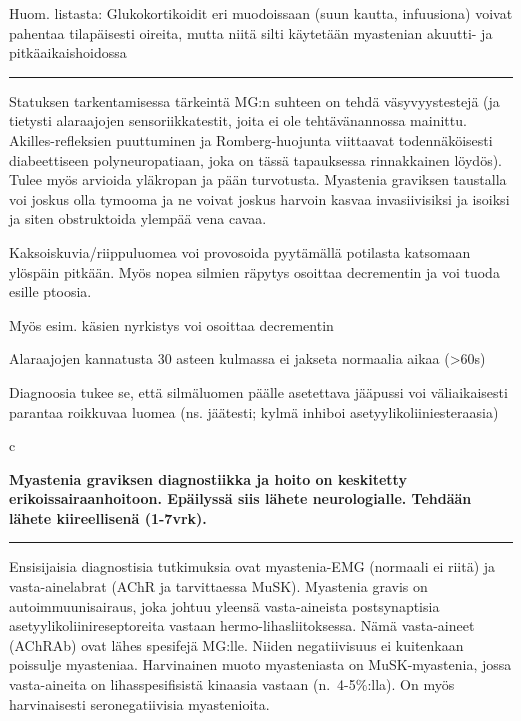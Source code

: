 \documentclass[
]{book}
\begin{document}
Huom. listasta: Glukokortikoidit eri muodoissaan (suun kautta, infuusiona) voivat pahentaa tilapäisesti oireita, mutta niitä silti käytetään myastenian akuutti- ja pitkäaikaishoidossa

\begin{center}\rule{0.5\linewidth}{0.5pt}\end{center}

Statuksen tarkentamisessa tärkeintä MG:n suhteen on tehdä väsyvyystestejä (ja tietysti alaraajojen sensoriikkatestit, joita ei ole tehtävänannossa mainittu. Akilles-refleksien puuttuminen ja Romberg-huojunta viittaavat todennäköisesti diabeettiseen polyneuropatiaan, joka on tässä tapauksessa rinnakkainen löydös). Tulee myös arvioida yläkropan ja pään turvotusta. Myastenia graviksen taustalla voi joskus olla tymooma ja ne voivat joskus harvoin kasvaa invasiivisiksi ja isoiksi ja siten obstruktoida ylempää vena cavaa.

Kaksoiskuvia/riippuluomea voi provosoida pyytämällä potilasta katsomaan ylöspäin pitkään. Myös nopea silmien räpytys osoittaa decrementin ja voi tuoda esille ptoosia.

Myös esim. käsien nyrkistys voi osoittaa decrementin

Alaraajojen kannatusta 30 asteen kulmassa ei jakseta normaalia aikaa (\textgreater60s)

Diagnoosia tukee se, että silmäluomen päälle asetettava jääpussi voi väliaikaisesti parantaa roikkuvaa luomea (ns. jäätesti; kylmä inhiboi asetyylikoliiniesteraasia)

c

\textbf{Myastenia graviksen diagnostiikka ja hoito on keskitetty erikoissairaanhoitoon. Epäilyssä siis lähete neurologialle. Tehdään lähete kiireellisenä (1-7vrk).}

\begin{center}\rule{0.5\linewidth}{0.5pt}\end{center}

Ensisijaisia diagnostisia tutkimuksia ovat myastenia-EMG (normaali ei riitä) ja vasta-ainelabrat (AChR ja tarvittaessa MuSK). Myastenia gravis on autoimmuunisairaus, joka johtuu yleensä vasta-aineista postsynaptisia asetyylikoliinireseptoreita vastaan hermo-lihasliitoksessa. Nämä vasta-aineet (AChRAb) ovat lähes spesifejä MG:lle. Niiden negatiivisuus ei kuitenkaan poissulje myasteniaa. Harvinainen muoto myasteniasta on MuSK-myastenia, jossa vasta-aineita on lihasspesifisistä kinaasia vastaan (n.~4-5\%:lla). On myös harvinaisesti seronegatiivisia myastenioita.
\end{document}
